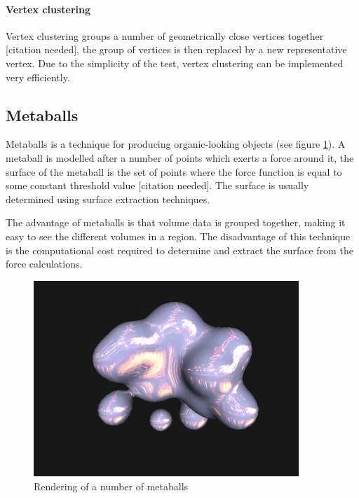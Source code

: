 
\paragraph{Vertex clustering}


Vertex clustering groups a number of geometrically close vertices together
[citation needed], the group of vertices is then replaced by a new
representative vertex.  Due to the simplicity of the test, vertex clustering
can be implemented very efficiently.



\subsection{Metaballs}
\label{sub:background_metaballs}


Metaballs is a technique for producing organic-looking objects (see figure
\ref{fig:background_metaballs}). A metaball is modelled after a number of
points which exerts a force around it, the surface of the metaball is the set
of points where the force function is equal to some constant threshold value
[citation needed]. The surface is usually determined using surface extraction
techniques.

The advantage of metaballs is that volume data is grouped together, making it
easy to see the different volumes in a region. The disadvantage of this
technique is the computational cost required to determine and extract the
surface from the force calculations.

\begin{figure}[h!]
  \begin{center}
    \includegraphics[width=100mm]{metaballs}
  \end{center}
  \caption{Rendering of a number of metaballs}
  \label{fig:background_metaballs}
\end{figure}

